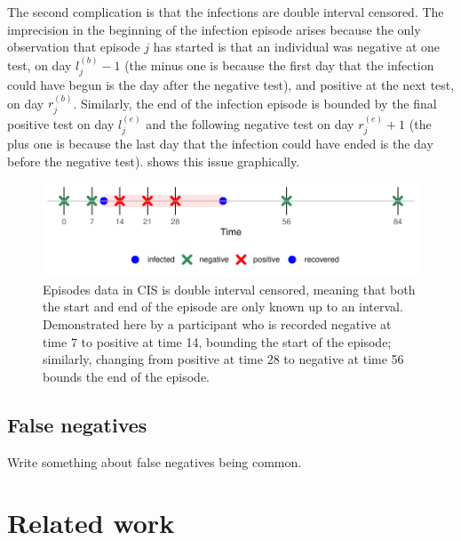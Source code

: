 \documentclass[12pt, letterpaper]{article} %
\begin{document}
The second complication is that the infections are double interval censored.
The imprecision in the beginning of the infection episode arises because the only observation that episode $j$ has started is that an individual was negative at one test, on day $l_j^{(b)}-1$ (the minus one is because the first day that the infection could have begun is the day after the negative test), and positive at the next test, on day $r_j^{(b)}$.
Similarly, the end of the infection episode is bounded by the final positive test on day $l_j^{(e)}$ and the following negative test on day $r_j^{(e)}+1$ (the plus one is because the last day that the infection could have ended is the day before the negative test).
 shows this issue graphically.
\begin{figure}
  \centering \includegraphics{cis-perfect-testing/double-interval-censor}
  \caption[Double-interval censoring in CIS data]{Episodes data in CIS is double interval censored, meaning that both the start and end of the episode are only known up to an interval. Demonstrated here by a participant who is recorded negative at time 7 to positive at time 14, bounding the start of the episode; similarly, changing from positive at time 28 to negative at time 56 bounds the end of the episode. \label{perf-test:fig:double-interval-censor}}
\end{figure}

\subsection{False negatives}

Write something about false negatives being common.

\section{Related work}
\end{document}
